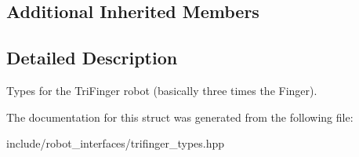 \subsection*{Additional Inherited Members}


\subsection{Detailed Description}
Types for the Tri\+Finger robot (basically three times the Finger). 

The documentation for this struct was generated from the following file\+:\begin{DoxyCompactItemize}
\item 
include/robot\+\_\+interfaces/trifinger\+\_\+types.\+hpp\end{DoxyCompactItemize}
